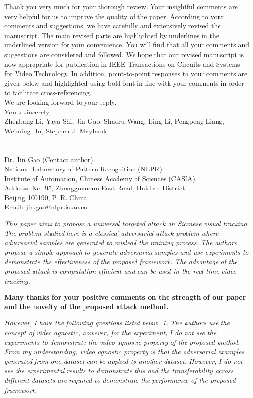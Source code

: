 \documentclass[12pt]{article}
\begin{document}
Thank you very much for your thorough review. Your insightful comments are very helpful for us to improve the quality of the paper. According to your comments and suggestions, we have carefully and extensively revised the manuscript. The main revised parts are highlighted by underlines in the underlined version for your convenience. You will find that all your comments and suggestions are considered and followed. We hope that our revised manuscript is now appropriate for publication in IEEE Transactions on Circuits and Systems for Video Technology.
In addition, point-to-point responses to your comments are given below and highlighted using bold font in line with your comments in order to facilitate cross-referencing.\\[10pt]
\indent We are looking forward to your reply.\\[10pt]
\noindent Yours sincerely,\\
\noindent Zhenbang Li, Yaya Shi, Jin Gao, Shaoru Wang, Bing Li, Pengpeng Liang, Weiming Hu, Stephen J. Maybank
\\
\\
\\
\noindent Dr. Jin Gao (Contact author)\\
\noindent National Laboratory of Pattern Recognition (NLPR)\\
\noindent Institute of Automation, Chinese Academy of Sciences (CASIA)\\
\noindent Address: No. 95, Zhongguancun East Road, Haidian District,\\
\noindent Beijing 100190, P. R. China\\
\noindent Email: jin.gao@nlpr.ia.ac.cn

\newpage
\textit{This paper aims to propose a universal targeted attack on Siamese visual tracking. The problem studied here is a classical adversarial attack problem where adversarial samples are generated to mislead the training process. The authors propose a simple approach to generate adversarial samples and use experiments to demonstrate the effectiveness of the proposed framework. The advantage of the proposed attack is computation efficient and can be used in the real-time video tracking.}

\textbf{Many thanks for your positive comments on the strength of our paper and the novelty of the proposed attack method.}

\textit{However, I have the following questions listed below. 1. The authors use the concept of video agnostic, however, for the experiment, I do not see the experiments to demonstrate the video agnostic property of the proposed method. From my understanding, video agnostic property is that the adversarial examples generated from one dataset can be applied to another dataset. However, I do not see the experimental results to demonstrate this and the transferability across different datasets are required to demonstrate the performance of the proposed framework.}
\end{document}
